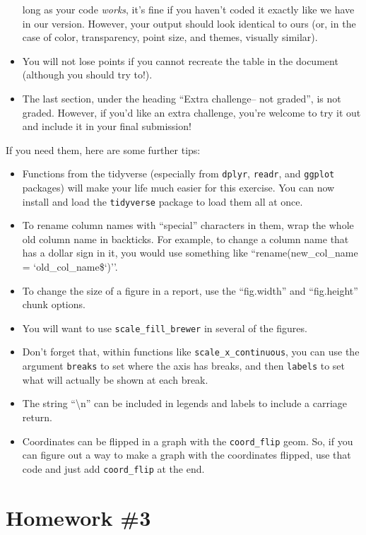 \documentclass[]{book}
\providecommand{\tightlist}{%
  \setlength{\itemsep}{0pt}\setlength{\parskip}{0pt}}
\begin{document}
\begin{itemize}
  long as your code \emph{works}, it's fine if you haven't coded it
  exactly like we have in our version. However, your output should look
  identical to ours (or, in the case of color, transparency, point size,
  and themes, visually similar).
\item
  You will not lose points if you cannot recreate the table in the
  document (although you should try to!).
\item
  The last section, under the heading ``Extra challenge-- not graded'',
  is not graded. However, if you'd like an extra challenge, you're
  welcome to try it out and include it in your final submission!
\end{itemize}

If you need them, here are some further tips:

\begin{itemize}
\tightlist
\item
  Functions from the tidyverse (especially from \texttt{dplyr},
  \texttt{readr}, and \texttt{ggplot} packages) will make your life much
  easier for this exercise. You can now install and load the
  \texttt{tidyverse} package to load them all at once.
\item
  To rename column names with ``special'' characters in them, wrap the
  whole old column name in backticks. For example, to change a column
  name that has a dollar sign in it, you would use something like
  ``rename(new\_col\_name = `old\_col\_name\$`)''.
\item
  To change the size of a figure in a report, use the ``fig.width'' and
  ``fig.height'' chunk options.
\item
  You will want to use \texttt{scale\_fill\_brewer} in several of the
  figures.
\item
  Don't forget that, within functions like
  \texttt{scale\_x\_continuous}, you can use the argument
  \texttt{breaks} to set where the axis has breaks, and then
  \texttt{labels} to set what will actually be shown at each break.
\item
  The string ``\textbackslash{}n'' can be included in legends and labels
  to include a carriage return.
\item
  Coordinates can be flipped in a graph with the \texttt{coord\_flip}
  geom. So, if you can figure out a way to make a graph with the
  coordinates flipped, use that code and just add \texttt{coord\_flip}
  at the end.
\end{itemize}

\section{Homework \#3}\label{homework-3}
\end{document}
